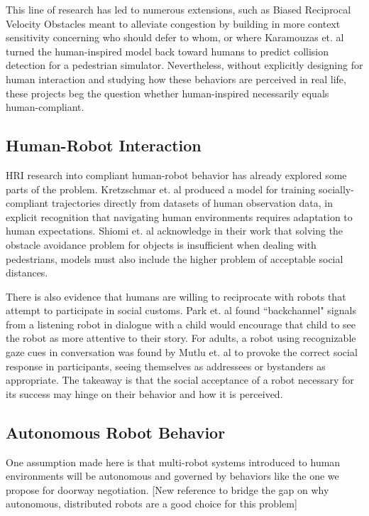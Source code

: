 \documentclass[letterpaper, 10 pt, conference]{ieeeconf}  %
\begin{document}
This line of research has led to numerous extensions, such as Biased Reciprocal Velocity Obstacles\cite{c4} meant to alleviate congestion by building in more context sensitivity concerning who should defer to whom, or where Karamouzas et. al\cite{c5} turned the human-inspired model back toward humans to predict collision detection for a pedestrian simulator. Nevertheless, without explicitly designing for human interaction and studying how these behaviors are perceived in real life, these projects beg the question whether human-inspired necessarily equals human-compliant.


\subsection{Human-Robot Interaction}

HRI research into compliant human-robot behavior has already explored some parts of the problem. Kretzschmar et. al\cite{c6} produced a model for training socially-compliant trajectories directly from datasets of human observation data, in explicit recognition that navigating human environments requires adaptation to human expectations. Shiomi et. al\cite{c7} acknowledge in their work that solving the obstacle avoidance problem for objects is insufficient when dealing with pedestrians, models must also include the higher problem of acceptable social distances. 

There is also evidence that humans are willing to reciprocate with robots that attempt to participate in social customs. Park et. al\cite{c8} found ``backchannel" signals from a listening robot in dialogue with a child would encourage that child to see the robot as more attentive to their story. For adults, a robot using recognizable gaze cues in conversation was found by Mutlu et. al\cite{c9} to provoke the correct social response in participants, seeing themselves as addressees or bystanders as appropriate. The takeaway is that the social acceptance of a robot necessary for its success may hinge on their behavior and how it is perceived.


\subsection{Autonomous Robot Behavior}

One assumption made here is that multi-robot systems introduced to human environments will be autonomous and governed by behaviors like the one we propose for doorway negotiation. [New reference to bridge the gap on why autonomous, distributed robots are a good choice for this problem]
\end{document}
